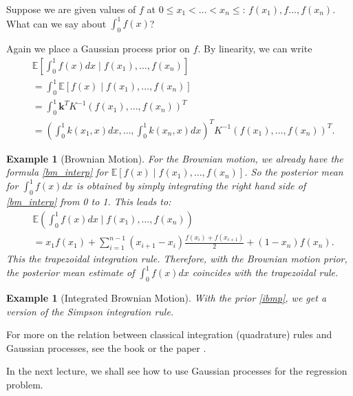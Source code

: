 \documentclass{scrartcl}
\newtheorem{example}[theorem]{Example}
\newcommand{\E}{{\mathbb E}}
\begin{document}
Suppose we are given values of $f$ at $0 \leq x_1 < \dots < x_n \leq$: $f(x_1),
f\dots, f(x_n)$. What can we say about $\int_0^1f(x)$?

Again we place a Gaussian process prior on $f$. By linearity, we can
write 
\begin{align*}
 & \E \left[ \int_0^1 f(x) dx \mid f(x_1), \dots, f(x_n) \right] \\ &=
  \int_0^1 \E \left[ f(x) \mid f(x_1), \dots, f(x_n) \right] \\ &=
                                                                  \int_0^1 \mathbf{k}^T K^{-1} (f(x_1), \dots, f(x_n))^T \\
  &= \left(\int_0^1 k(x_1, x) dx, \dots,\int_0^1 k(x_n, x) dx \right)^T
    K^{-1} (f(x_1), \dots, f(x_n))^T.  
\end{align*}

\begin{example}[Brownian Motion]
  For the Brownian motion, we already have the formula
  \eqref{bm_interp} for $\E [f(x) \mid f(x_1), \dots, f(x_n)]$. So the
  posterior mean for $\int_0^1 f(x) dx$ is obtained by simply
  integrating the right hand side of \eqref{bm_interp} from 0 to
  1. This leads to:
  \begin{align*}
    & \E \left(\int_0^1 f(x) dx \mid f(x_1), \dots, f(x_n) \right) \\
    &= x_1 f(x_1) + \sum_{i=1}^{n-1} (x_{i+1} - x_i) \frac{f(x_i) +
      f(x_{i+1})}{2} + (1 - x_n) f(x_n). 
  \end{align*}
  This the trapezoidal integration rule. Therefore, with the Brownian
  motion prior, the posterior mean estimate of $\int_0^1 f(x) dx$
  coincides with the trapezoidal rule. 
\end{example}

\begin{example}[Integrated Brownian Motion]
  With the prior \eqref{ibmp}, we get a version of the Simpson
  integration rule.  
\end{example}
For more on the relation between classical integration (quadrature)
rules and Gaussian processes, see the book
\citet{hennig2022probabilistic} or the paper
\citet{diaconis1988bayesian}.

In the  next lecture, we shall see how to use Gaussian processes for
the regression problem. 
\end{document}
